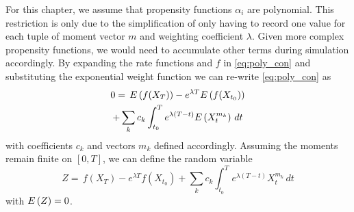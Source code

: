 For this chapter, we assume that propensity functions $\alpha_i$ are polynomial.
This restriction is only due to the simplification of only having to
record one value for each tuple of moment vector $m$ and weighting
coefficient $\lambda$.
Given more complex propensity functions, we would need to accumulate
other terms during simulation accordingly.
By expanding the rate functions and $f$ in \eqref{eq:poly_con} and
substituting the
exponential weight function we can re-write \eqref{eq:poly_con} as
\begin{multline}\label{eq:simpl_exp}
  0 =\,
  {E}\left(f(X_{T})\right)
  - e^{\lambda T}{E}\left(f(X_{t_0})\right)\\
  + \sum_{k}c_k\int_{t_0}^{T}e^{\lambda(T-t)}{E}\left(X_t^{m_k}\right)\,dt
\end{multline}
with coefficients $c_k$ and vectors $m_k$ defined accordingly.
Assuming the moments remain finite on $[0,T]$, we can define the random variable
\begin{equation}\label{eq:z}
  Z =\,
  f(X_{T})
  - e^{\lambda T}f(X_{t_0})
  + \sum_{k}c_k\int_{t_0}^{T}e^{\lambda(T-t)}X_t^{m_k}\,dt
\end{equation}
with ${E}\left(Z\right)=0$.

